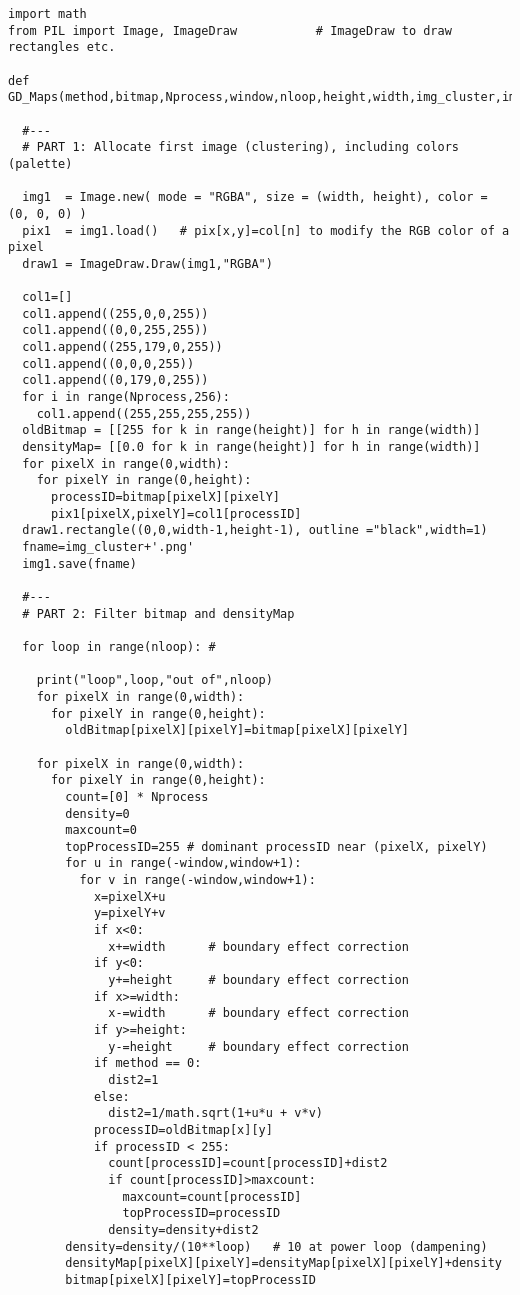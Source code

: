\documentclass[oneside,10pt]{book}
\begin{document}
\begin{lstlisting}
import math
from PIL import Image, ImageDraw           # ImageDraw to draw rectangles etc.

def GD_Maps(method,bitmap,Nprocess,window,nloop,height,width,img_cluster,img_density):

  #---
  # PART 1: Allocate first image (clustering), including colors (palette)

  img1  = Image.new( mode = "RGBA", size = (width, height), color = (0, 0, 0) )
  pix1  = img1.load()   # pix[x,y]=col[n] to modify the RGB color of a pixel
  draw1 = ImageDraw.Draw(img1,"RGBA")

  col1=[]
  col1.append((255,0,0,255))
  col1.append((0,0,255,255))
  col1.append((255,179,0,255))
  col1.append((0,0,0,255))
  col1.append((0,179,0,255))
  for i in range(Nprocess,256):
    col1.append((255,255,255,255))
  oldBitmap = [[255 for k in range(height)] for h in range(width)]
  densityMap= [[0.0 for k in range(height)] for h in range(width)]
  for pixelX in range(0,width):
    for pixelY in range(0,height):
      processID=bitmap[pixelX][pixelY]
      pix1[pixelX,pixelY]=col1[processID]
  draw1.rectangle((0,0,width-1,height-1), outline ="black",width=1)
  fname=img_cluster+'.png'
  img1.save(fname)

  #---
  # PART 2: Filter bitmap and densityMap

  for loop in range(nloop): #

    print("loop",loop,"out of",nloop)
    for pixelX in range(0,width):
      for pixelY in range(0,height):
        oldBitmap[pixelX][pixelY]=bitmap[pixelX][pixelY]

    for pixelX in range(0,width):
      for pixelY in range(0,height):
        count=[0] * Nprocess
        density=0
        maxcount=0
        topProcessID=255 # dominant processID near (pixelX, pixelY)
        for u in range(-window,window+1):
          for v in range(-window,window+1):
            x=pixelX+u
            y=pixelY+v
            if x<0:
              x+=width      # boundary effect correction
            if y<0:
              y+=height     # boundary effect correction
            if x>=width:
              x-=width      # boundary effect correction
            if y>=height:
              y-=height     # boundary effect correction
            if method == 0:
              dist2=1
            else:
              dist2=1/math.sqrt(1+u*u + v*v)
            processID=oldBitmap[x][y]
            if processID < 255:
              count[processID]=count[processID]+dist2
              if count[processID]>maxcount:
                maxcount=count[processID]
                topProcessID=processID
              density=density+dist2
        density=density/(10**loop)   # 10 at power loop (dampening)
        densityMap[pixelX][pixelY]=densityMap[pixelX][pixelY]+density
        bitmap[pixelX][pixelY]=topProcessID


\end{lstlisting}
\end{document}
